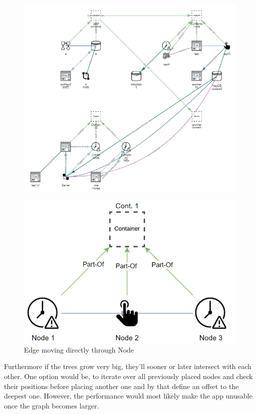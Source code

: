 \begin{figure}[H]
\centering
\includegraphics[scale=.7]{Bilder/TreeGood.png}
\label{ex:TreeGood}
\end{figure}

\begin{figure}[H] 
\centering
\includegraphics[scale=.4]{Bilder/TreeBad.png}
\caption{Edge moving directly through Node}
\label{ex:TreeBadEdge}
\end{figure}

Furthermore if the trees grow very big, they'll sooner or later intersect with each other. One option would be, to iterate over all previously placed nodes and check their positions before placing another one and by that define an offset to the deepest one. However, the performance would most likely make the app unusable once the graph becomes larger.

